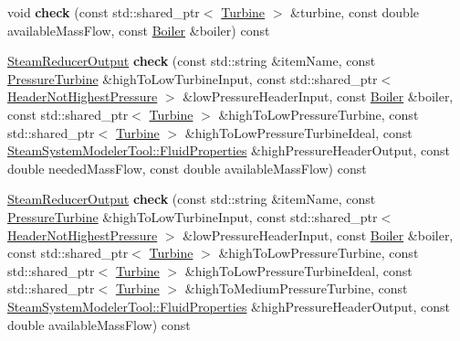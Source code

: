 \begin{DoxyCompactItemize}
\item 
\mbox{\label{class_steam_balance_checker_service_a6d3407ac1df1e18292c5a709c3e2e5c6}} 
void {\bfseries check} (const std\+::shared\+\_\+ptr$<$ \hyperlink{class_turbine}{Turbine} $>$ \&turbine, const double available\+Mass\+Flow, const \hyperlink{class_boiler}{Boiler} \&boiler) const
\item 
\mbox{\label{class_steam_balance_checker_service_a04607d0e0f71f3455f84cfd09d84afe5}} 
\hyperlink{class_steam_reducer_output}{Steam\+Reducer\+Output} {\bfseries check} (const std\+::string \&item\+Name, const \hyperlink{class_pressure_turbine}{Pressure\+Turbine} \&high\+To\+Low\+Turbine\+Input, const std\+::shared\+\_\+ptr$<$ \hyperlink{class_header_not_highest_pressure}{Header\+Not\+Highest\+Pressure} $>$ \&low\+Pressure\+Header\+Input, const \hyperlink{class_boiler}{Boiler} \&boiler, const std\+::shared\+\_\+ptr$<$ \hyperlink{class_turbine}{Turbine} $>$ \&high\+To\+Low\+Pressure\+Turbine, const std\+::shared\+\_\+ptr$<$ \hyperlink{class_turbine}{Turbine} $>$ \&high\+To\+Low\+Pressure\+Turbine\+Ideal, const \hyperlink{struct_steam_system_modeler_tool_1_1_fluid_properties}{Steam\+System\+Modeler\+Tool\+::\+Fluid\+Properties} \&high\+Pressure\+Header\+Output, const double needed\+Mass\+Flow, const double available\+Mass\+Flow) const
\item 
\mbox{\label{class_steam_balance_checker_service_a8b55108b5a59c4512d1bb435ef6dc41d}} 
\hyperlink{class_steam_reducer_output}{Steam\+Reducer\+Output} {\bfseries check} (const std\+::string \&item\+Name, const \hyperlink{class_pressure_turbine}{Pressure\+Turbine} \&high\+To\+Low\+Turbine\+Input, const std\+::shared\+\_\+ptr$<$ \hyperlink{class_header_not_highest_pressure}{Header\+Not\+Highest\+Pressure} $>$ \&low\+Pressure\+Header\+Input, const \hyperlink{class_boiler}{Boiler} \&boiler, const std\+::shared\+\_\+ptr$<$ \hyperlink{class_turbine}{Turbine} $>$ \&high\+To\+Low\+Pressure\+Turbine, const std\+::shared\+\_\+ptr$<$ \hyperlink{class_turbine}{Turbine} $>$ \&high\+To\+Low\+Pressure\+Turbine\+Ideal, const std\+::shared\+\_\+ptr$<$ \hyperlink{class_turbine}{Turbine} $>$ \&high\+To\+Medium\+Pressure\+Turbine, const \hyperlink{struct_steam_system_modeler_tool_1_1_fluid_properties}{Steam\+System\+Modeler\+Tool\+::\+Fluid\+Properties} \&high\+Pressure\+Header\+Output, const double available\+Mass\+Flow) const

\end{DoxyCompactItemize}
